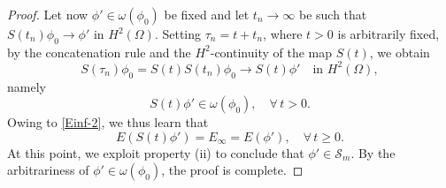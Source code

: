 \documentclass[11pt,reqno]{amsart}
\theoremstyle{remark}
\def\d{{\rm d}}
\def\div{\mathrm{div}}
\numberwithin{equation}{section}
\def\d{{\rm d}}
\begin{document}
\begin{proof}
Let now $\phi' \in \omega(\phi_0)$ be fixed and let
$t_n\to\infty$ be such that $S(t_n)\phi_0\to \phi'$ in $H^2(\Omega)$. 
Setting $\tau_n=t+t_n$, where $t >0$ is arbitrarily fixed, by the concatenation rule and the $H^2$-continuity of the map $S(t)$, 
we obtain
$$
S(\tau_n)\phi_0=S(t)S(t_n)\phi_0\to S(t)\phi'\quad \text{in }H^2(\Omega),
$$
namely 
$$
S(t)\phi'\in \omega(\phi_0),\quad\forall \, t >0.
$$
Owing to \eqref{Einf-2}, we thus learn that
$$
E(S(t)\phi')=E_\infty=E(\phi'), \quad \forall \, t \geq 0.
$$
At this point, we exploit property (ii) to conclude that $\phi'\in \mathcal{S}_m$. By the arbitrariness of $\phi'\in \omega(\phi_0)$, the proof is complete.
\end{proof}
\end{document}
